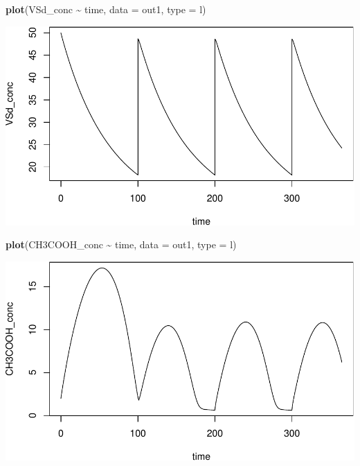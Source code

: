 \documentclass[
]{article}
\newenvironment{Shaded}{\begin{snugshade}}{\end{snugshade}}
\newcommand{\AttributeTok}[1]{\textcolor[rgb]{0.13,0.29,0.53}{#1}}
\newcommand{\FunctionTok}[1]{\textcolor[rgb]{0.13,0.29,0.53}{\textbf{#1}}}
\newcommand{\NormalTok}[1]{#1}
\newcommand{\SpecialCharTok}[1]{\textcolor[rgb]{0.81,0.36,0.00}{\textbf{#1}}}
\newcommand{\StringTok}[1]{\textcolor[rgb]{0.31,0.60,0.02}{#1}}
\begin{document}
\begin{Shaded}
\begin{Highlighting}[]
\FunctionTok{plot}\NormalTok{(VSd\_conc }\SpecialCharTok{\textasciitilde{}}\NormalTok{ time, }\AttributeTok{data =}\NormalTok{ out1, }\AttributeTok{type =} \StringTok{\textquotesingle{}l\textquotesingle{}}\NormalTok{)}
\end{Highlighting}
\end{Shaded}

\includegraphics{simple_demo_files/figure-latex/unnamed-chunk-9-3.pdf}

\begin{Shaded}
\begin{Highlighting}[]
\FunctionTok{plot}\NormalTok{(CH3COOH\_conc }\SpecialCharTok{\textasciitilde{}}\NormalTok{ time, }\AttributeTok{data =}\NormalTok{ out1, }\AttributeTok{type =} \StringTok{\textquotesingle{}l\textquotesingle{}}\NormalTok{)}
\end{Highlighting}
\end{Shaded}

\includegraphics{simple_demo_files/figure-latex/unnamed-chunk-9-4.pdf}
\end{document}
